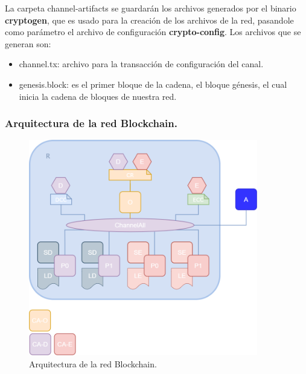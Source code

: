 \vspace{5mm}

\noindent La carpeta channel-artifacts se guardarán los archivos generados por el binario \textbf{cryptogen}, que es usado para 
la creación de los archivos de la red, pasandole como parámetro el archivo de configuración \textbf{crypto-config}. Los archivos
que se generan son:

\begin{itemize}
  \item channel.tx: archivo para la transacción de configuración del canal.
  \item genesis.block: es el primer bloque de la cadena, el bloque génesis, el cual inicia la cadena de bloques de nuestra red.
\end{itemize}

\subsubsection{Arquitectura de la red Blockchain.}

\begin{figure}[ht!]
  \centering
  \includegraphics[width=10cm]{imagenes/desarrollo/arquitectura_networkiot}
  \caption{Arquitectura de la red Blockchain.}
  \label{fig:arquitectura-blockchain}
\end{figure}

